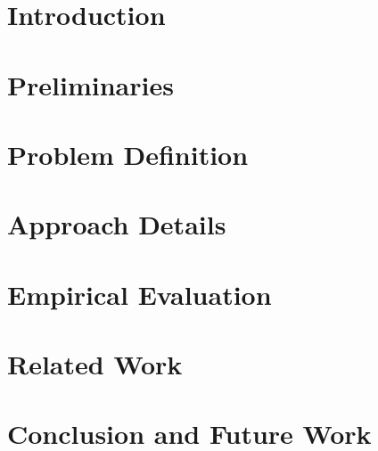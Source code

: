 \section{Introduction}\label{sec.intro}


\section{Preliminaries}\label{sec.prelim}


\section{Problem Definition}\label{sec.problem}


\section{Approach Details}\label{sec.approach}


\section{Empirical Evaluation}\label{sec.experiment}


\section{Related Work}\label{sec.related}


\section{Conclusion and Future Work} \label{sec.conclusion}
 